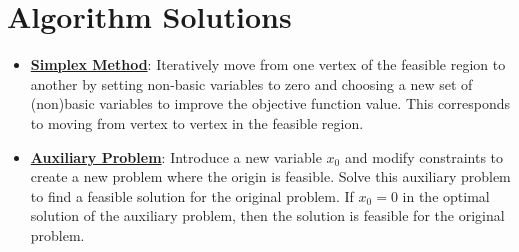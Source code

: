 \documentclass{article}%
\begin{document}
\section{Algorithm Solutions}%
\label{sec:AlgorithmSolutions}%
\begin{itemize}[leftmargin=*]%
\item \href{https://www.math.purdue.edu/~yipn/421/2024-08-27-ExSimplex.pdf#page=6}{\textbf{Simplex Method}}: Iteratively move from one vertex of the feasible region to another by setting non-basic variables to zero and choosing a new set of (non)basic variables to improve the objective function value. This corresponds to moving from vertex to vertex in the feasible region.%
\item \href{https://www.math.purdue.edu/~yipn/421/2024-08-27-ExSimplex.pdf#page=32}{\textbf{Auxiliary Problem}}: Introduce a new variable $x_0$ and modify constraints to create a new problem where the origin is feasible. Solve this auxiliary problem to find a feasible solution for the original problem. If $x_0 = 0$ in the optimal solution of the auxiliary problem, then the solution is feasible for the original problem.%
\end{itemize}

%
\end{document}
